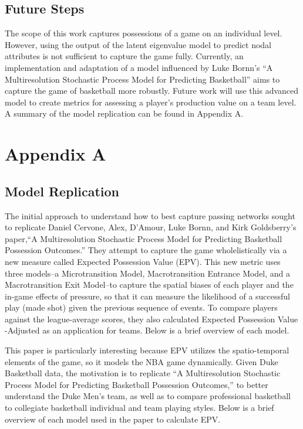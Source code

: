 \documentclass[12pt,twoside]{dukestatscithesis}
\theoremstyle{definition}
\theoremstyle{definition}
\theoremstyle{definition}
\theoremstyle{remark}
\begin{document}
\section{Future Steps}\label{future-steps}

The scope of this work captures possessions of a game on an individual
level. However, using the output of the latent eigenvalue model to
predict nodal attributes is not sufficient to capture the game fully.
Currently, an implementation and adaptation of a model influenced by
Luke Bornn's ``A Multiresolution Stochastic Process Model for Predicting
Basketball'' aims to capture the game of basketball more robustly.
Future work will use this advanced model to create metrics for assessing
a player's production value on a team level. A summary of the model
replication can be found in Appendix A.

\chapter{Appendix A}\label{appendix-a}

\section{Model Replication}\label{model-replication}

The initial approach to understand how to best capture passing networks
sought to replicate Daniel Cervone, Alex, D'Amour, Luke Bornn, and Kirk
Goldsberry's paper,``A Multiresolution Stochastic Process Model for
Predicting Basketball Possession Outcomes.'' They attempt to capture the
game wholelistically via a new measure called Expected Possession Value
(EPV). This new metric uses three models--a Microtransition Model,
Macrotransition Entrance Model, and a Macrotransition Exit Model--to
capture the spatial biases of each player and the in-game effects of
pressure, so that it can measure the likelihood of a successful play
(made shot) given the previous sequence of events. To compare players
against the league-average scores, they also calculated Expected
Possession Value -Adjusted as an application for teams. Below is a brief
overview of each model.

This paper is particularly interesting because EPV utilizes the
spatio-temporal elements of the game, so it models the NBA game
dynamically. Given Duke Basketball data, the motivation is to replicate
``A Multiresolution Stochastic Process Model for Predicting Basketball
Possession Outcomes,'' to better understand the Duke Men's team, as well
as to compare professional basketball to collegiate basketball
individual and team playing styles. Below is a brief overview of each
model used in the paper to calculate EPV.
\end{document}
